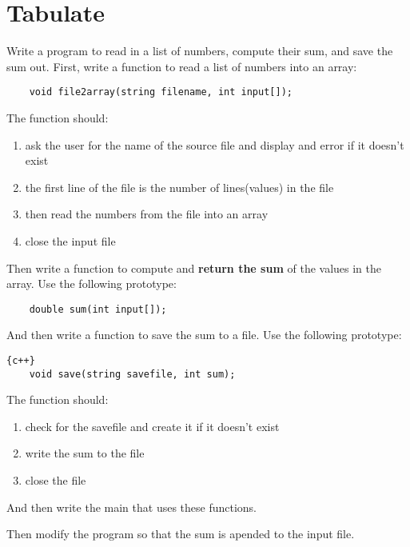 \documentclass{article}
\begin{document}
\section*{Tabulate}
Write a program to read in a list of numbers, compute their sum, and save the sum out. First, write a function to read a list of numbers into an array:
\begin{lstlisting}
	void file2array(string filename, int input[]);
\end{lstlisting}
The function should:
\begin{enumerate}
	\item ask the user for the name of the source file and display and error if it doesn't exist
	\item the first line of the file is the number of lines(values) in the file
	\item then read the numbers from the file into an array
	\item close the input file
\end{enumerate}
Then write a function to compute and \textbf{return the sum} of the values in the array. Use the following prototype:
\begin{lstlisting}
	double sum(int input[]);
\end{lstlisting}
And then write a function to save the sum to a file. Use the following prototype:
\begin{lstlisting}{c++}
	void save(string savefile, int sum);
\end{lstlisting}
The function should:
\begin{enumerate}
	\item check for the savefile and create it if it doesn't exist
	\item write the sum to the file
	\item close the file
\end{enumerate}
And then write the main that uses these functions. 


Then modify the program so that the sum is apended to the input file.
\end{document}
